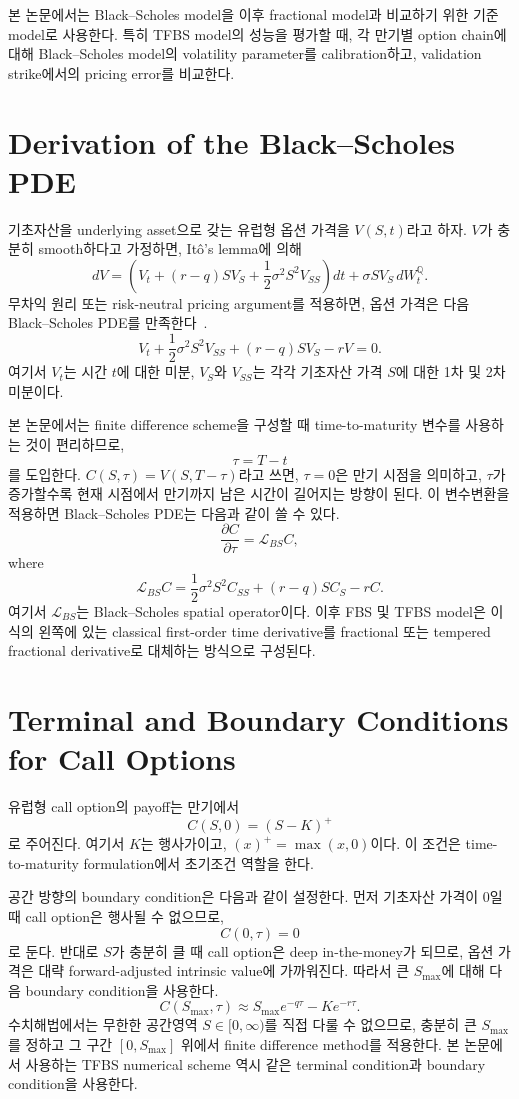 \documentclass[11pt,a4paper]{report}
\begin{document}
본 논문에서는 Black--Scholes model을 이후 fractional model과 비교하기 위한 기준 model로 사용한다. 특히 TFBS model의 성능을 평가할 때, 각 만기별 option chain에 대해 Black--Scholes model의 volatility parameter를 calibration하고, validation strike에서의 pricing error를 비교한다.

\section{Derivation of the Black--Scholes PDE}

기초자산을 underlying asset으로 갖는 유럽형 옵션 가격을 $V(S,t)$라고 하자. $V$가 충분히 smooth하다고 가정하면, It\^o's lemma에 의해
\[
dV
=
\left(
V_t
+
(r-q)S V_S
+
\frac{1}{2}\sigma^2 S^2 V_{SS}
\right)dt
+
\sigma S V_S\,dW_t^{\mathbb{Q}}.
\]
무차익 원리 또는 risk-neutral pricing argument를 적용하면, 옵션 가격은 다음 Black--Scholes PDE를 만족한다~\cite{BlackScholes1973,Merton1973}.
\[
V_t
+
\frac{1}{2}\sigma^2 S^2 V_{SS}
+
(r-q)S V_S
-
rV
=
0.
\]
여기서 $V_t$는 시간 $t$에 대한 미분, $V_S$와 $V_{SS}$는 각각 기초자산 가격 $S$에 대한 1차 및 2차 미분이다.

본 논문에서는 finite difference scheme을 구성할 때 time-to-maturity 변수를 사용하는 것이 편리하므로,
\[
\tau = T-t
\]
를 도입한다. $C(S,\tau)=V(S,T-\tau)$라고 쓰면, $\tau=0$은 만기 시점을 의미하고, $\tau$가 증가할수록 현재 시점에서 만기까지 남은 시간이 길어지는 방향이 된다. 이 변수변환을 적용하면 Black--Scholes PDE는 다음과 같이 쓸 수 있다.
\[
\frac{\partial C}{\partial \tau}
=
\mathcal{L}_{BS} C,
\]
where
\[
\mathcal{L}_{BS} C
=
\frac{1}{2}\sigma^2 S^2 C_{SS}
+
(r-q)S C_S
-
rC.
\]
여기서 $\mathcal{L}_{BS}$는 Black--Scholes spatial operator이다. 이후 FBS 및 TFBS model은 이 식의 왼쪽에 있는 classical first-order time derivative를 fractional 또는 tempered fractional derivative로 대체하는 방식으로 구성된다.

\section{Terminal and Boundary Conditions for Call Options}

유럽형 call option의 payoff는 만기에서
\[
C(S,0) = (S-K)^+
\]
로 주어진다. 여기서 $K$는 행사가이고, $(x)^+=\max(x,0)$이다. 이 조건은 time-to-maturity formulation에서 초기조건 역할을 한다.

공간 방향의 boundary condition은 다음과 같이 설정한다. 먼저 기초자산 가격이 0일 때 call option은 행사될 수 없으므로,
\[
C(0,\tau)=0
\]
로 둔다. 반대로 $S$가 충분히 클 때 call option은 deep in-the-money가 되므로, 옵션 가격은 대략 forward-adjusted intrinsic value에 가까워진다. 따라서 큰 $S_{\max}$에 대해 다음 boundary condition을 사용한다.
\[
C(S_{\max},\tau)
\approx
S_{\max}e^{-q\tau}
-
Ke^{-r\tau}.
\]
수치해법에서는 무한한 공간영역 $S\in[0,\infty)$를 직접 다룰 수 없으므로, 충분히 큰 $S_{\max}$를 정하고 그 구간 $[0,S_{\max}]$ 위에서 finite difference method를 적용한다. 본 논문에서 사용하는 TFBS numerical scheme 역시 같은 terminal condition과 boundary condition을 사용한다.
\end{document}
